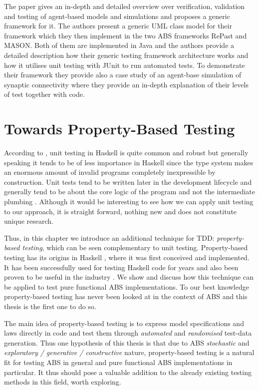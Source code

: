 The paper \cite{gurcan_generic_2013} gives an in-depth and detailed overview over verification, validation and testing of agent-based models and simulations and proposes a generic framework for it. The authors present a generic UML class model for their framework which they then implement in the two ABS frameworks RePast and MASON. Both of them are implemented in Java and the authors provide a detailed description how their generic testing framework architecture works and how it utilises unit testing with JUnit to run automated tests. To demonstrate their framework they provide also a case study of an agent-base simulation of synaptic connectivity where they provide an in-depth explanation of their levels of test together with code.

\section*{Towards Property-Based Testing}
According to \cite{diehl_what_nodate}, unit testing in Haskell is quite common and robust but generally speaking it tends to be of less importance in Haskell since the type system makes an enormous amount of invalid programs completely inexpressible by construction. Unit tests tend to be written later in the development lifecycle and generally tend to be about the core logic of the program and not the intermediate plumbing \cite{diehl_what_nodate}. Although it would be interesting to see how we can apply unit testing to our approach, it is straight forward, nothing new and does not constitute unique research. 

Thus, in this chapter we introduce an additional technique for TDD: \textit{property-based testing}, which can be seen complementary to unit testing. Property-based testing has its origins in Haskell \cite{claessen_quickcheck_2000,claessen_testing_2002,runciman_smallcheck_2008}, where it was first conceived and implemented. It has been successfully used for testing Haskell code for years and also been proven to be useful in the industry \cite{hughes_quickcheck_2007}. We show and discuss how this technique can be applied to test pure functional ABS implementations. To our best knowledge property-based testing has never been looked at in the context of ABS and this thesis is the first one to do so.

\medskip

The main idea of property-based testing is to express model specifications and laws directly in code and test them through \textit{automated} and \textit{randomised} test-data generation. Thus one hypothesis of this thesis is that due to ABS \textit{stochastic} and \textit{exploratory / generative / constructive } nature, property-based testing is a natural fit for testing ABS in general and pure functional ABS implementations in particular. It thus should pose a valuable addition to the already existing testing methods in this field, worth exploring.

